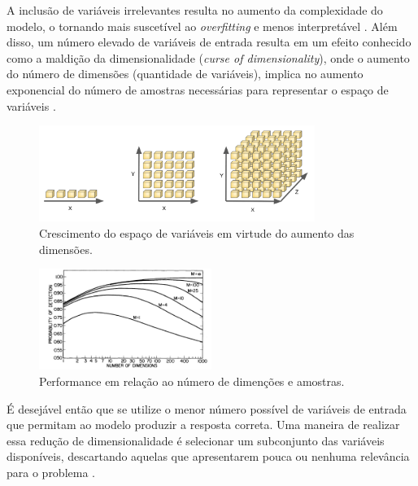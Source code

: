 A inclusão de variáveis irrelevantes resulta no aumento da complexidade do modelo, o tornando mais suscetível ao \textit{overfitting} e menos interpretável \cite[p. 204]{intro_stat_learn}. Além disso, um número elevado de variáveis de entrada resulta em um efeito conhecido como a maldição da dimensionalidade (\textit{curse of dimensionality}), onde o aumento do número de dimensões (quantidade de variáveis), implica no aumento exponencial do número de amostras necessárias para representar o espaço de variáveis \cite[p. 34]{bishop_2006}.

\begin{figure}[!htb]
    \caption{Crescimento do espaço de variáveis em virtude do aumento das dimensões.}
    \begin{center}    
    \includegraphics[width=0.8\textwidth]{imgs/rev/dimensionalty_grown.png}
    \end{center}
    \label{fig:dim_grown}
\end{figure}

\begin{figure}[!htb]
    \caption{Performance em relação ao número de dimenções e amostras.}
    \begin{center}  
    \includegraphics[width=0.5\textwidth]{imgs/rev/dim_performance}
    \end{center}
    \label{fig:dim_perf}
\end{figure}

É desejável então que se utilize o menor número possível de variáveis de entrada que permitam ao modelo produzir a resposta correta. Uma maneira de realizar essa redução de dimensionalidade é selecionar um subconjunto das variáveis disponíveis, descartando aquelas que apresentarem pouca ou nenhuma relevância para o problema \cite[p. 204]{intro_stat_learn}.


